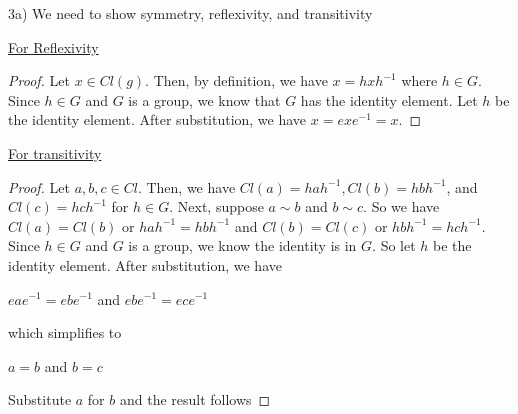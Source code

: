 \documentclass[executivepaper]{article}
\begin{document}
\begin{flushleft}

3a) We need to show symmetry, reflexivity, and transitivity

\begin{center}

\underline{For Reflexivity}

\begin{proof}

Let $x \in Cl(g)$. Then, by definition, we have $x=hxh^{-1}$ where $h \in G$. Since $h \in G$ and $G$ is a group, we know that $G$ has the identity element. Let $h$ be the identity element. After substitution, we have $x=exe^{-1}=x$.

\end{proof}

\end{center}

\vspace{3mm}

\begin{center}

\underline{For transitivity}

\begin{proof}

Let $a,b,c \in Cl$. Then, we have $Cl(a)=hah^{-1}, Cl(b)=hbh^{-1}$, and $Cl(c)=hch^{-1}$ for $h \in G$. Next, suppose $a \sim b$ and $b \sim c$. So we have $Cl(a)=Cl(b)$ or $hah^{-1}=hbh^{-1}$ and $Cl(b)=Cl(c)$ or $hbh^{-1}=hch^{-1}$. Since $h \in G$ and $G$ is a group, we know the identity is in $G$. So let $h$ be the identity element. After substitution, we have

\begin{center}

$eae^{-1}=ebe^{-1}$ and $ebe^{-1}=ece^{-1}$

\end{center}

which simplifies to 

\begin{center}

$a=b$ and $b=c$

\end{center}

Substitute $a$ for $b$ and the result follows

\end{proof}

\end{center}

\begin{center}


\end{center}
\end{flushleft}
\end{document}

